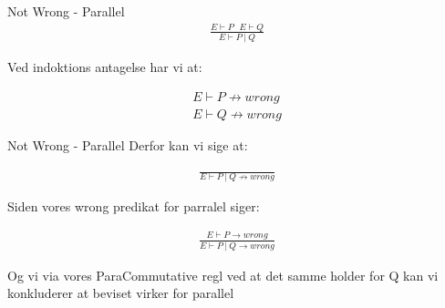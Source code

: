 \begin{frame}{Not Wrong - Parallel}
	\begin{align*}
		\frac{E \vdash P\ \ \ E \vdash Q}{E \vdash P\ |\ Q}
	\end{align*}

	Ved indoktions antagelse har vi at:

	\begin{align*}
		E \vdash P \nrightarrow wrong \\
		E \vdash Q \nrightarrow wrong
	\end{align*}
\end{frame}

\begin{frame}{Not Wrong - Parallel}
	Derfor kan vi sige at:

	\begin{align*}
		\frac{}{E \vdash P\ |\ Q \nrightarrow wrong}
	\end{align*}

	Siden vores wrong predikat for parralel siger:

	\begin{align*}
		\frac{E \vdash P \rightarrow wrong}{E \vdash P\ |\ Q \rightarrow wrong}
	\end{align*}

	Og vi via vores ParaCommutative regl ved at det samme holder for Q kan vi konkluderer at beviset virker for parallel
\end{frame}

